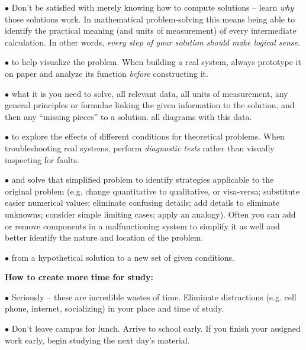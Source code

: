 \item{$\bullet$}   Don't be satisfied with merely knowing how to compute solutions -- learn {\it why} those solutions work.  In mathematical problem-solving this means being able to identify the practical meaning (and units of measurement) of every intermediate calculation.  In other words, {\it every step of your solution should make logical sense}.
\vskip 5pt
\item{$\bullet$}  to help visualize the problem.  When building a real system, always prototype it on paper and analyze its function {\it before} constructing it.
\vskip 5pt
\item{$\bullet$}  what it is you need to solve,  all relevant data,  all units of measurement,  any general principles or formulae linking the given information to the solution, and then  any ``missing pieces'' to a solution.   all diagrams with this data.
\vskip 5pt
\item{$\bullet$}  to explore the effects of different conditions for theoretical problems.  When troubleshooting real systems, perform {\it diagnostic tests} rather than visually inspecting for faults.
\vskip 5pt
\item{$\bullet$}  and solve that simplified problem to identify strategies applicable to the original problem (e.g. change quantitative to qualitative, or visa-versa; substitute easier numerical values; eliminate confusing details; add details to eliminate unknowns; consider simple limiting cases; apply an analogy).  Often you can add or remove components in a malfunctioning system to simplify it as well and better identify the nature and location of the problem.
\vskip 5pt
\item{$\bullet$}  from a hypothetical solution to a new set of given conditions.
\medskip

\vskip 10pt

\noindent
{\bf How to create more time for study:}

\item{$\bullet$}   Seriously -- these are incredible wastes of time.  Eliminate distractions (e.g. cell phone, internet, socializing) in your place and time of study.
\vskip 5pt
\item{$\bullet$}   Don't leave campus for lunch.  Arrive to school early.  If you finish your assigned work early, begin studying the next day's material.  
\medskip


